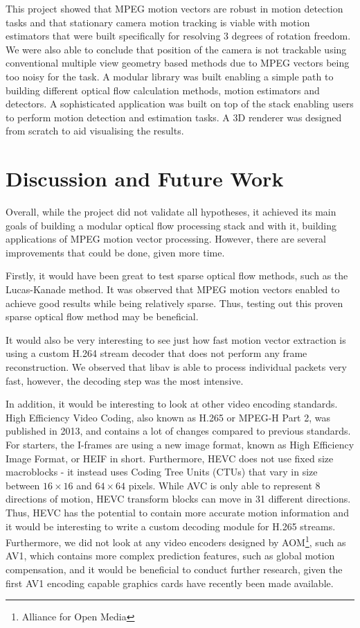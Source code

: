 \documentclass[11pt,english]{report}
\begin{document}
This project showed that MPEG motion vectors are robust in motion detection tasks and that stationary camera motion tracking is viable with motion estimators that were built specifically for resolving 3 degrees of rotation freedom. We were also able to conclude that position of the camera is not trackable using conventional multiple view geometry based methods due to MPEG vectors being too noisy for the task. A modular library was built enabling a simple path to building different optical flow calculation methods, motion estimators and detectors. A sophisticated application was built on top of the stack enabling users to perform motion detection and estimation tasks. A 3D renderer was designed from scratch to aid visualising the results.

\section{Discussion and Future Work}

Overall, while the project did not validate all hypotheses, it achieved its main goals of building a modular optical flow processing stack and with it, building applications of MPEG motion vector processing. However, there are several improvements that could be done, given more time.

Firstly, it would have been great to test sparse optical flow methods, such as the Lucas-Kanade method\cite{lucas-kanade}. It was observed that MPEG motion vectors enabled to achieve good results while being relatively sparse. Thus, testing out this proven sparse optical flow method may be beneficial.

It would also be very interesting to see just how fast motion vector extraction is using a custom H.264 stream decoder that does not perform any frame reconstruction. We observed that libav is able to process individual packets very fast, however, the decoding step was the most intensive.

In addition, it would be interesting to look at other video encoding standards. High Efficiency Video Coding, also known as H.265 or MPEG-H Part 2, was published in 2013, and contains a lot of changes compared to previous standards. For starters, the I-frames are using a new image format, known as High Efficiency Image Format, or HEIF in short. Furthermore, HEVC does not use fixed size macroblocks - it instead uses Coding Tree Units (CTUs) that vary in size between $16 \times 16$ and $64 \times 64$ pixels\cite{h265}. While AVC is only able to represent 8 directions of motion, HEVC transform blocks can move in 31 different directions. Thus, HEVC has the potential to contain more accurate motion information and it would be interesting to write a custom decoding module for H.265 streams. Furthermore, we did not look at any video encoders designed by AOM\footnote{Alliance for Open Media}, such as AV1, which contains more complex prediction features, such as global motion compensation\cite{av1}\cite{av1_global_motion}, and it would be beneficial to conduct further research, given the first AV1 encoding capable graphics cards have recently been made available.
\end{document}
